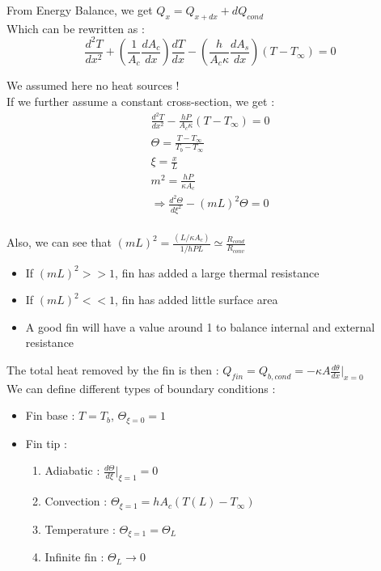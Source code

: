 \documentclass[../main.tex]{subfiles}
\begin{document}
From Energy Balance, we get $Q_x = Q_{x+dx} + dQ_{cond}$\\
Which can be rewritten as : \begin{equation}
    \frac{d^2T}{dx^2} + (\frac{1}{A_c} \frac{dA_c}{dx})\frac{dT}{dx} - (\frac{h}{A_c \kappa} \frac{dA_s}{dx}) (T-T_\infty) = 0
\end{equation}

\warning We assumed here no heat sources !\\

If we further assume a constant cross-section, we get : \begin{equation}
    \begin{gathered}
        \frac{d^2T}{dx^2} - \frac{hP}{A_c \kappa} (T-T_\infty) = 0\\
        \Theta = \frac{T-T_\infty}{T_b-T_\infty}\\
        \xi = \frac{x}{L}\\
        m^2 = \frac{hP}{\kappa A_c}\\
        \Rightarrow \frac{d^2 \Theta}{d \xi^2} - (mL)^2 \Theta = 0\\
    \end{gathered}
\end{equation}

Also, we can see that $(mL)^2 = \frac{(L/\kappa A_c)}{1/hPL} \simeq \frac{R_{cond}}{R_{conv}}$\\

\begin{itemize}
    \item If $(mL)^2>>1$, fin has added a large thermal resistance\\
    \item If $(mL)^2<<1$, fin has added little surface area\\
    \item A good fin will have a value around 1 to balance internal and external resistance\\
\end{itemize}

The total heat removed by the fin is then : $Q_{fin} = Q_{b,cond} = -\kappa A \frac{d\theta}{dx}\lvert_{x=0}$\\

We can define different types of boundary conditions : \begin{itemize}
    \item Fin base : $T = T_b$, $\Theta_{\xi=0} = 1$\\
    \item Fin tip : \begin{enumerate}
        \item Adiabatic : $\frac{d\Theta}{d\xi}\lvert_{\xi = 1} =0$\\
        \item Convection : $\Theta_{\xi=1} = h A_c (T(L)-T_\infty)$\\
        \item Temperature : $\Theta_{\xi=1} = \Theta_L$\\
        \item Infinite fin : $\Theta_L \rightarrow 0$\\
    \end{enumerate}
\end{itemize}
\end{document}
